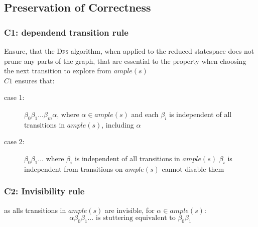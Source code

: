 \documentclass[a4paper, 10pt]{article}
\begin{document}
\subsection*{Preservation of Correctness}
\subsubsection*{C1: dependend transition rule}
Ensure, that the \textsc{Dfs} algorithm, when applied to the reduced statespace does not prune any parts of the graph, that are essential to the property when choosing the next transition to explore from $ample(s)$ \\
$C1$ ensures that:
\begin{description}
    \item[case 1:]$\beta_0\beta_1\dots\beta_m\alpha$, where $\alpha\in ample(s)$ and each $\beta_i$ is independent of all transitions in $ample(s)$, including $\alpha$
    \item[case 2:] $\beta_0\beta_1\dots$ where $\beta_i$ is independent of all transitions in $ample(s)$
    \fitem $\beta_i$ is independent from transitions on $ample(s)$ \follows cannot disable them
\end{description}
\subsubsection*{C2: Invisibility rule}
as alls transitions in $ample(s)$ are invisible, for $\alpha\in ample(s)$:
\[ \alpha\beta_0\beta_1\dots \textrm{ is stuttering equivalent to } \beta_0\beta_1 \]
\end{document}
